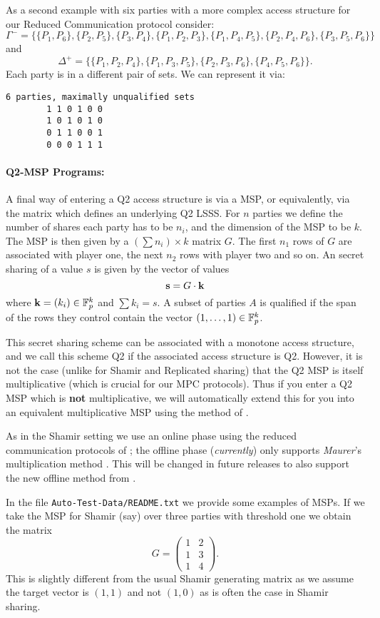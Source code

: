 \noindent
As a second example with six parties with a more complex
access structure for our Reduced Communication protocol consider:
\[\Gamma^- = \{\{P_1, P_6\}, \{P_2, P_5\}, \{P_3, P_4\}, \{P_1, P_2, P_3\}, \{P_1,
  P_4, P_5\}, \{P_2, P_4, P_6\}, \{P_3, P_5, P_6\}\}\]
and
\[\Delta^+ = \{\{P_1, P_2, P_4\}, \{P_1, P_3, P_5\}, \{P_2, P_3, P_6\}, \{P_4, P_5, P_6\}\}.\]
Each party is in a different pair of sets.  We can represent it via:
\begin{verbatim}
6 parties, maximally unqualified sets
        1 1 0 1 0 0
        1 0 1 0 1 0
        0 1 1 0 0 1
        0 0 0 1 1 1
\end{verbatim}

\paragraph{Q2-MSP Programs:}
A final way of entering a Q2 access structure is via a MSP, or equivalently,
via the matrix which defines an underlying Q2 LSSS.
For $n$ parties we define the number of shares each party has to be
$n_i$, and the dimension of the MSP to be $k$. The MSP is then given
by a $(\sum n_i) \times k$ matrix $G$.
The first $n_1$ rows of $G$ are associated with player one, the
next $n_2$ rows with player two and so on.
An secret sharing of a value $s$ is given by the vector of values
\[ \mathbf{s} = G \cdot \mathbf{k} \]
where $\mathbf{k} = (k_i) \in {\mathbb{F}}_p^k$ and $\sum k_i =s$.
A subset of parties $A$ is qualified if the span of the rows they control
contain the vector $(1,\ldots,1) \in {\mathbb{F}}_p^k$.

This secret sharing scheme can be associated with a monotone
access structure, and we call this scheme Q2 if the associated
access structure is Q2.
However, it is not the case (unlike for Shamir and Replicated sharing)
that the Q2 MSP is itself multiplicative (which is crucial for
our MPC protocols).
Thus if you enter a Q2 MSP which is {\bf not} multiplicative, we
will automatically extend this for you into an equivalent multiplicative MSP
using the method of \cite{CDM00}.

As in the Shamir setting we use an online phase using the reduced communication
protocols of \cite{KRSW};
the offline phase ({\em currently}) only supports {\em Maurer}'s multiplication method
\cite{Maurer}.
This will be changed in future releases to also support the new offline method from
\cite{SW18}.

In the file \verb+Auto-Test-Data/README.txt+ we provide some examples
of MSPs. If we take the MSP for Shamir (say) over three parties with threshold
one we obtain the matrix
\[
   G = \left( \begin{array}{cc}
      1 & 2 \\ 1 & 3 \\ 1 & 4
       \end{array} \right).
\]
This is slightly different from the usual Shamir generating matrix
as we assume the target vector is $(1,1)$ and not $(1,0)$ as is often
the case in Shamir sharing.


